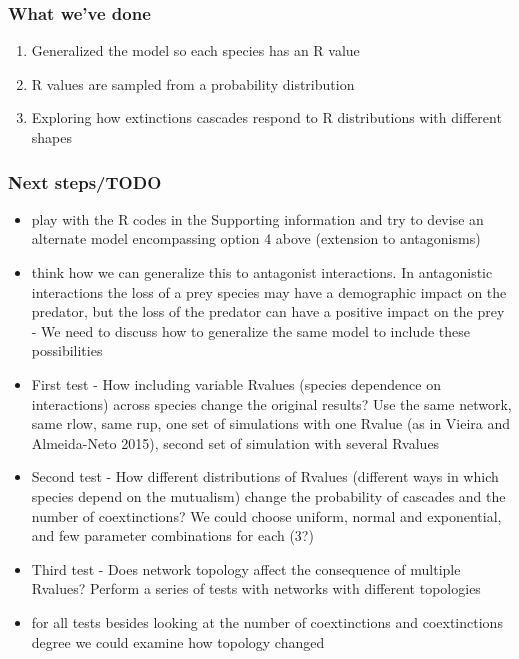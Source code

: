 \documentclass[12pt]{article}
\begin{document}
\subsubsection*{What we've done}

\begin{enumerate}
	\item{Generalized the model so each species has an R value}
	\item{R values are sampled from a probability distribution}
	\item{Exploring how extinctions cascades respond to R distributions with different shapes}	
\end{enumerate}







\subsubsection*{Next steps/TODO}

\begin{itemize}

	\item play with the R codes in the Supporting information and try to devise an alternate model encompassing option 4 above (extension to antagonisms)
	
	\item think how we can generalize this to antagonist interactions. In antagonistic interactions the loss of a prey species may have a demographic impact on the predator, but the loss of the predator can have a positive impact on the prey - We need to discuss how to generalize the same model to include these possibilities


	\item First test - How including variable Rvalues (species dependence on interactions) across species change the original results? Use the same network, same rlow, same rup, one set of simulations with one Rvalue (as in Vieira and Almeida-Neto 2015), second set of simulation with several Rvalues

	\item Second test - How different distributions of Rvalues (different ways in which species depend on the mutualism) change the probability of cascades and the number of coextinctions? We could choose uniform, normal and exponential, and few parameter combinations for each (3?)

	\item Third test - Does network topology affect the consequence of multiple Rvalues? Perform a series of tests with networks with different topologies

	\item for all tests besides looking at the number of coextinctions and coextinctions degree we could examine how topology changed

\end{itemize}
\end{document}
